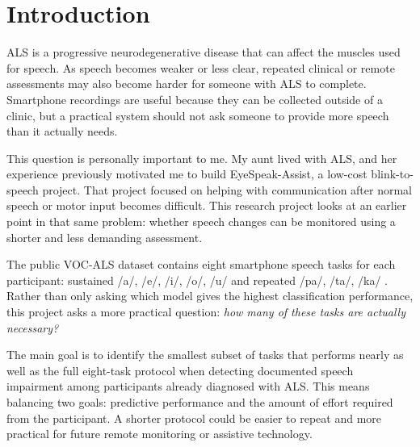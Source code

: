 \section{Introduction}

ALS is a progressive neurodegenerative disease that can affect the muscles used for speech. As speech becomes weaker or less clear, repeated clinical or remote assessments may also become harder for someone with ALS to complete. Smartphone recordings are useful because they can be collected outside of a clinic, but a practical system should not ask someone to provide more speech than it actually needs.

This question is personally important to me. My aunt lived with ALS, and her experience previously motivated me to build EyeSpeak-Assist, a low-cost blink-to-speech project. That project focused on helping with communication after normal speech or motor input becomes difficult. This research project looks at an earlier point in that same problem: whether speech changes can be monitored using a shorter and less demanding assessment.

The public VOC-ALS dataset contains eight smartphone speech tasks for each participant: sustained /a/, /e/, /i/, /o/, /u/ and repeated /pa/, /ta/, /ka/ \cite{dubbioso2024vocals}. Rather than only asking which model gives the highest classification performance, this project asks a more practical question: \textit{how many of these tasks are actually necessary?}

The main goal is to identify the smallest subset of tasks that performs nearly as well as the full eight-task protocol when detecting documented speech impairment among participants already diagnosed with ALS. This means balancing two goals: predictive performance and the amount of effort required from the participant. A shorter protocol could be easier to repeat and more practical for future remote monitoring or assistive technology.

